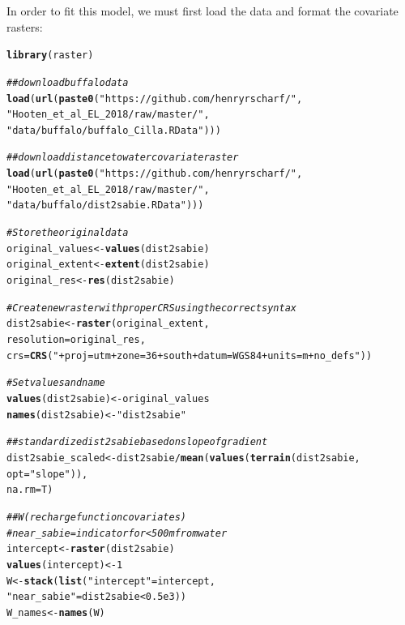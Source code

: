 \documentclass[12pt]{article}\usepackage[]{graphicx}\usepackage[]{xcolor}
\makeatletter
\newcommand{\hlnum}[1]{\textcolor[rgb]{0.686,0.059,0.569}{#1}}%
\newcommand{\hlsng}[1]{\textcolor[rgb]{0.192,0.494,0.8}{#1}}%
\newcommand{\hlcom}[1]{\textcolor[rgb]{0.678,0.584,0.686}{\textit{#1}}}%
\newcommand{\hlopt}[1]{\textcolor[rgb]{0,0,0}{#1}}%
\newcommand{\hldef}[1]{\textcolor[rgb]{0.345,0.345,0.345}{#1}}%
\newcommand{\hlkwb}[1]{\textcolor[rgb]{0.69,0.353,0.396}{#1}}%
\newcommand{\hlkwc}[1]{\textcolor[rgb]{0.333,0.667,0.333}{#1}}%
\newcommand{\hlkwd}[1]{\textcolor[rgb]{0.737,0.353,0.396}{\textbf{#1}}}%
\newenvironment{kframe}{%
 \def\at@end@of@kframe{}%
 \ifinner\ifhmode%
  \def\at@end@of@kframe{\end{minipage}}%
  \begin{minipage}{\columnwidth}%
 \fi\fi%
 \def\FrameCommand##1{\hskip\@totalleftmargin \hskip-\fboxsep
 \colorbox{shadecolor}{##1}\hskip-\fboxsep
     \hskip-\linewidth \hskip-\@totalleftmargin \hskip\columnwidth}%
 \MakeFramed {\advance\hsize-\width
   \@totalleftmargin\z@ \linewidth\hsize
   \@setminipage}}%
 {\par\unskip\endMakeFramed%
 \at@end@of@kframe}
\newenvironment{knitrout}{}{} %
\makeatother
\begin{document}
In order to fit this model, we must first load the data and format the covariate rasters:
\begin{knitrout}
\color{fgcolor}\begin{kframe}
\begin{alltt}
\hlkwd{library}\hldef{(raster)}

\hlcom{## download buffalo data}
\hlkwd{load}\hldef{(}\hlkwd{url}\hldef{(}\hlkwd{paste0}\hldef{(}\hlsng{"https://github.com/henryrscharf/"}\hldef{,}
         \hlsng{"Hooten_et_al_EL_2018/raw/master/"}\hldef{,}
         \hlsng{"data/buffalo/buffalo_Cilla.RData"}\hldef{)))}

\hlcom{## download distance to water covariate raster}
\hlkwd{load}\hldef{(}\hlkwd{url}\hldef{(}\hlkwd{paste0}\hldef{(}\hlsng{"https://github.com/henryrscharf/"}\hldef{,}
                \hlsng{"Hooten_et_al_EL_2018/raw/master/"}\hldef{,}
                \hlsng{"data/buffalo/dist2sabie.RData"}\hldef{)))}

\hlcom{# Store the original data}
\hldef{original_values} \hlkwb{<-} \hlkwd{values}\hldef{(dist2sabie)}
\hldef{original_extent} \hlkwb{<-} \hlkwd{extent}\hldef{(dist2sabie)}
\hldef{original_res} \hlkwb{<-} \hlkwd{res}\hldef{(dist2sabie)}

\hlcom{# Create new raster with proper CRS using the correct syntax}
\hldef{dist2sabie} \hlkwb{<-} \hlkwd{raster}\hldef{(original_extent,}
                     \hlkwc{resolution} \hldef{= original_res,}
                     \hlkwc{crs} \hldef{=} \hlkwd{CRS}\hldef{(}\hlsng{"+proj=utm +zone=36 +south +datum=WGS84 +units=m +no_defs"}\hldef{))}

\hlcom{# Set values and name}
\hlkwd{values}\hldef{(dist2sabie)} \hlkwb{<-} \hldef{original_values}
\hlkwd{names}\hldef{(dist2sabie)} \hlkwb{<-} \hlsng{"dist2sabie"}

\hlcom{## standardize dist2sabie based on slope of gradient}
\hldef{dist2sabie_scaled} \hlkwb{<-} \hldef{dist2sabie} \hlopt{/} \hlkwd{mean}\hldef{(}\hlkwd{values}\hldef{(}\hlkwd{terrain}\hldef{(dist2sabie,}
                                                      \hlkwc{opt} \hldef{=} \hlsng{"slope"}\hldef{)),}
                                       \hlkwc{na.rm} \hldef{= T)}

\hlcom{## W (recharge function covariates)}
\hlcom{# near_sabie = indicator for <500m from water}
\hldef{intercept} \hlkwb{<-} \hlkwd{raster}\hldef{(dist2sabie)}
\hlkwd{values}\hldef{(intercept)} \hlkwb{<-} \hlnum{1}
\hldef{W} \hlkwb{<-} \hlkwd{stack}\hldef{(}\hlkwd{list}\hldef{(}\hlsng{"intercept"} \hldef{= intercept,}
                \hlsng{"near_sabie"} \hldef{= dist2sabie} \hlopt{<} \hlnum{0.5e3}\hldef{))}
\hldef{W_names} \hlkwb{<-} \hlkwd{names}\hldef{(W)}


\end{alltt}
\end{kframe}
\end{knitrout}
\end{document}
